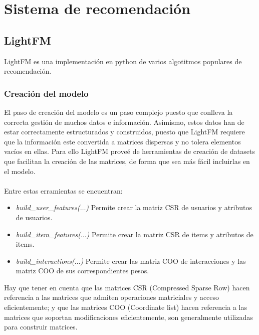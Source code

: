 \chapter{Sistema de recomendación}
\thispagestyle{fancy}
\section{LightFM}
LightFM es una implementación en python de varios algotitmos populares de recomendación.
\subsection{Creación del modelo}
El paso de creación del modelo es un paso complejo puesto que conlleva la correcta gestión de muchos datos e información. Asimismo, estos datos han de estar correctamente estructurados y construidos, puesto que LightFM requiere que la información este convertida a matrices dispersas y no tolera elementos vacíos en ellas. Para ello LightFM proveé de herramientas de creación de datasets que facilitan la creación de las matrices, de forma que sea más fácil incluirlas en el modelo. 
\\ \\
Entre estas erramientas se encuentran:

\begin{itemize}
    \item \textit{build\_user\_features($\ldots$)} \quad Permite crear la matriz CSR de usuarios y atributos de usuarios.
    \item \textit{build\_item\_features($\ldots$)} \quad Permite crear la matriz CSR  de items y atributos de items.
    \item \textit{build\_interactions($\ldots$)} \quad Permite crear las matriz COO de interacciones y las matriz COO de sus correspondientes pesos.
\end{itemize}

Hay que tener en cuenta que las matrices CSR (Compressed Sparse Row) hacen referencia a las matrices que admiten operaciones matriciales y acceso eficientemente; y que las matrices COO (Coordinate list) hacen referencia a las matrices que soportan modificaciones eficientemente, son generalmente utilizadas para construir matrices.


